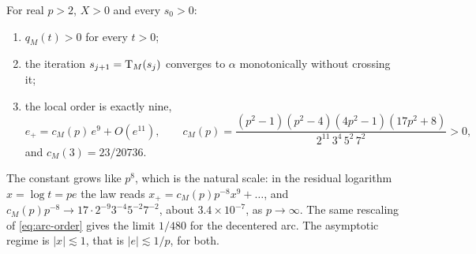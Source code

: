 \begin{theorem}\label{thm:mean}
For real $p>2$, $X>0$ and every $s_0>0$:
\begin{enumerate}[label=\textup{(\roman*)}]
\item $q_M(t)>0$ for every $t>0$;
\item the iteration $s_{j+1}=\mathrm{T}_M(s_j)$ converges to $\alpha$ monotonically without crossing it;
\item the local order is exactly nine,
\begin{equation}\label{eq:cM}
e_+=c_M(p)\,e^{9}+O(e^{11}),\qquad
c_M(p)=\frac{(p^{2}-1)(p^{2}-4)(4p^{2}-1)(17p^{2}+8)}{2^{11}\,3^{4}\,5^{2}\,7^{2}}>0 ,
\end{equation}
and $c_M(3)=23/20736$.
\end{enumerate}
\end{theorem}

The constant grows like $p^{8}$, which is the natural scale: in the residual logarithm $x=\log t=pe$ the
law reads $x_+=c_M(p)p^{-8}x^{9}+\dots$, and $c_M(p)p^{-8}\to17\cdot2^{-9}3^{-4}5^{-2}7^{-2}$, about
$3.4\times10^{-7}$, as $p\to\infty$. The same rescaling of \eqref{eq:arc-order} gives the limit $1/480$
for the decentered arc. The asymptotic regime is $|x|\lesssim1$, that is $|e|\lesssim1/p$, for both.

